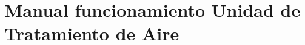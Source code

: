 
\cleardoublepage
\chapter{Manual funcionamiento Unidad de Tratamiento de Aire}

\label{chap:anexoManualUTA} %

